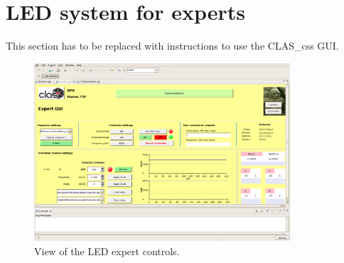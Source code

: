 \documentclass[12pt]{article}
\begin{document}
   \section{LED system for experts}

This section has to be replaced with instructions to use the CLAS\_css GUI.

\begin{figure}[htbp]
\center
\includegraphics[width=0.85\textwidth]{pics/LEDExpert_2014_12_20.png}
\caption{\label{LEDexpert} View of the LED expert controls.}
\end{figure}
\fi
\end{document}
